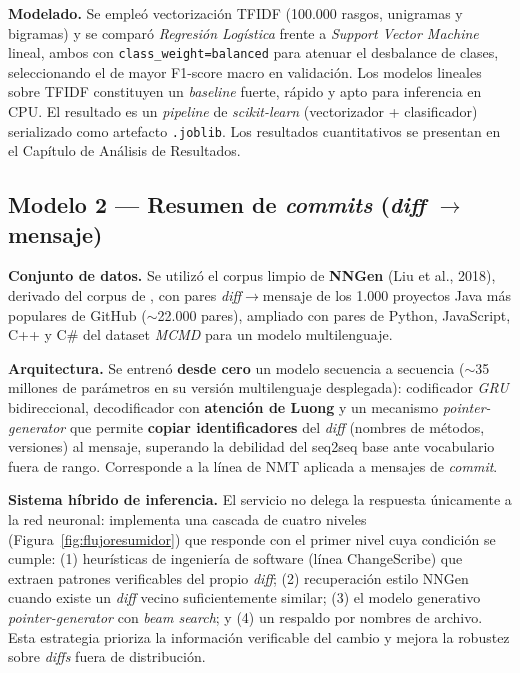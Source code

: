 \textbf{Modelado.} Se empleó vectorización \acrfull{TFIDF} (100.000 rasgos, unigramas y bigramas) y se comparó \textit{Regresión Logística} frente a \textit{Support Vector Machine} lineal, ambos con \texttt{class\_weight=balanced} para atenuar el desbalance de clases, seleccionando el de mayor F1-score macro en validación. Los modelos lineales sobre \acrshort{TFIDF} constituyen un \textit{baseline} fuerte, rápido y apto para inferencia en \acrshort{CPU}. El resultado es un \textit{pipeline} de \textit{scikit-learn} (vectorizador + clasificador) serializado como artefacto \texttt{.joblib}. Los resultados cuantitativos se presentan en el Capítulo de Análisis de Resultados.

\subsection{Modelo 2 — Resumen de \textit{commits} (\textit{diff} $\rightarrow$ mensaje)}

\textbf{Conjunto de datos.} Se utilizó el corpus limpio de \textbf{NNGen} (Liu et al., 2018), derivado del corpus de \cite{Jiang2017}, con pares \textit{diff}$\rightarrow$mensaje de los 1.000 proyectos Java más populares de GitHub ($\sim$22.000 pares), ampliado con pares de Python, JavaScript, C++ y C\# del dataset \textit{MCMD} para un modelo multilenguaje.

\textbf{Arquitectura.} Se entrenó \textbf{desde cero} un modelo secuencia a secuencia ($\sim$35 millones de parámetros en su versión multilenguaje desplegada): codificador \textit{GRU} bidireccional, decodificador con \textbf{atención de Luong} y un mecanismo \textit{pointer-generator} \citep{See2017} que permite \textbf{copiar identificadores} del \textit{diff} (nombres de métodos, versiones) al mensaje, superando la debilidad del seq2seq base ante vocabulario fuera de rango. Corresponde a la línea de \acrfull{NMT} aplicada a mensajes de \textit{commit}.

\textbf{Sistema híbrido de inferencia.} El servicio no delega la respuesta únicamente a la red neuronal: implementa una cascada de cuatro niveles (Figura~\ref{fig:flujoresumidor}) que responde con el primer nivel cuya condición se cumple: (1) heurísticas de ingeniería de software (línea ChangeScribe) que extraen patrones verificables del propio \textit{diff}; (2) recuperación estilo NNGen cuando existe un \textit{diff} vecino suficientemente similar; (3) el modelo generativo \textit{pointer-generator} con \textit{beam search}; y (4) un respaldo por nombres de archivo. Esta estrategia prioriza la información verificable del cambio y mejora la robustez sobre \textit{diffs} fuera de distribución.

